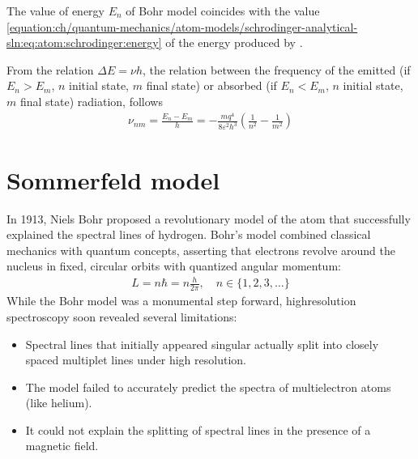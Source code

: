 \documentclass[letterpaper,10pt,english]{jupyterBook}
\begin{document}
\sphinxAtStartPar
{} The value of energy \(E_n\) of Bohr model coincides with the value \eqref{equation:ch/quantum-mechanics/atom-models/schrodinger-analytical-sln:eq:atom:schrodinger:energy} of the energy produced by {\hyperref[\detokenize{ch/quantum-mechanics/atom-models/schrodinger:quantum-mechanics-atom-models-schrodinger}]{}}.

\sphinxAtStartPar
From the relation \(\Delta E = \nu h\), the relation between the frequency of the emitted (if \(E_{n} > E_{m}\), \(n\) initial state, \(m\) final state) or absorbed (if \(E_n < E_m\), \(n\) initial state, \(m\) final state) radiation, follows
\begin{equation*}
\begin{split}\nu_{nm} = \frac{E_n - E_m}{h} = - \frac{m q^4}{8 \varepsilon^2 h^3} \left( \frac{1}{n^2} - \frac{1}{m^2} \right)\end{split}
\end{equation*}
\sphinxstepscope


\section{Sommerfeld model}
\label{\detokenize{ch/quantum-mechanics/atom-models/sommerfeld:sommerfeld-model}}\label{\detokenize{ch/quantum-mechanics/atom-models/sommerfeld:quantum-mechanics-atom-models-sommerfeld}}\label{\detokenize{ch/quantum-mechanics/atom-models/sommerfeld::doc}}
\sphinxAtStartPar
In 1913, Niels Bohr proposed a revolutionary model of the atom that successfully explained the spectral lines of hydrogen. Bohr’s model combined classical mechanics with quantum concepts, asserting that electrons revolve around the nucleus in fixed, circular orbits with quantized angular momentum:
\begin{equation*}
\begin{split}L = n \hbar = n \frac{h}{2\pi}, \quad n \in \{1, 2, 3, \dots\}\end{split}
\end{equation*}
\sphinxAtStartPar
While the Bohr model was a monumental step forward, high\sphinxhyphen{}resolution spectroscopy soon revealed several limitations:
\begin{itemize}
\item {} 
\sphinxAtStartPar
{} Spectral lines that initially appeared singular actually split into closely spaced multiplet lines under high resolution.

\item {} 
\sphinxAtStartPar
{} The model failed to accurately predict the spectra of multi\sphinxhyphen{}electron atoms (like helium).

\item {} 
\sphinxAtStartPar
{} It could not explain the splitting of spectral lines in the presence of a magnetic field.

\end{itemize}
\end{document}
